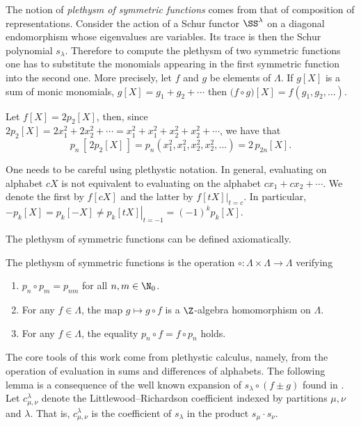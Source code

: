\documentclass[twoside]{article}
\begin{document}
The notion of \emph{plethysm of symmetric functions} comes from that of composition of representations.  Consider the action of a Schur functor $\SS^\lambda$ on a diagonal endomorphism whose eigenvalues are  variables. Its trace  is then the Schur polynomial $s_\lambda$. Therefore to compute the plethysm of two symmetric functions one has to substitute the monomials appearing in the first symmetric function into the second  one.
More precisely, let $f$ and $g$ be elements of $\Lambda$. If $g[X]$ is a sum of monic monomials, 
$g[X] = g_1 + g_2 + \cdots$ then 
$
\big( f \circ g \big) [X]=f(g_1, g_2, \ldots)
$.

\begin{ex}\label{alphabet}
Let $f[X]= 2p_2[X]$, then, since $2p_2[X] = 2x_1^2 + 2x_2^2 +\cdots = x_1^2 + x_1^2 + x_2^2 + x_2^2 + \cdots$, we have that
\[
p_n\, [ \, 2p_2 [X] \,] = p_n(x_1^2, x_1^2, x_2^2, x_2^2,\ldots) = 2\, p_{2n}[X].
\]
\end{ex}

\begin{warning}\label{note: different evaluations}
One needs to be careful using plethystic notation. In general, evaluating on alphabet $cX$ is not equivalent to evaluating on the alphabet $cx_1 + cx_2 + \cdots$. We denote the first by $f[cX]$ and the latter by $f[tX]|_{t=c}$. In particular, $-p_k[X] = p_k[-X] \ne \left.p_k[tX]\right|_{t=-1} = (-1)^k p_k[X]$.
\end{warning}

The plethysm of symmetric functions can be defined axiomatically.

\begin{samepage}
\begin{de} The plethysm of symmetric functions is the operation $\circ : \Lambda\times\Lambda\to\Lambda$ verifying
\begin{enumerate}
    \item $p_n\circ p_m = p_{nm}$ for all $n, m\in\N_0$.
    \item For any $f\in\Lambda$, the map $g\mapsto g\circ f$ is a $\Z$-algebra homomorphism on $\Lambda$.
    \item For any $f\in\Lambda$, the equality $p_n\circ f = f\circ p_n$ holds.
\end{enumerate}
\end{de}
\end{samepage}

The core tools of this work come from plethystic calculus, namely, from the operation of evaluation in sums and differences of alphabets.  The following lemma is a consequence of the well known expansion of $s_\lambda\circ(f\pm g)$   found in \cite{macdonald}.
Let $c_{\mu,\nu}^\lambda$ denote the Littlewood--Richardson 
coefficient indexed by partitions $\mu, \nu$ and $\lambda.$ 
That is, $c_{\mu,\nu}^\lambda$ is the coefficient of $s_\lambda$ in
the product $s_\mu\cdot s_\nu.$
\end{document}
